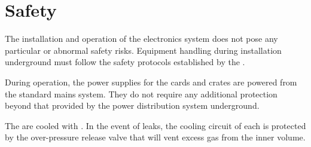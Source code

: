 \section{Safety}
\label{sec:dp-tpcelec-safety}
The installation and operation of the electronics system does not pose any particular or abnormal safety risks. %
Equipment handling during installation underground must %
follow the safety protocols established by the . 

During operation, the  power supplies for the  cards and  crates are powered from the standard mains system. They do not require any additional protection beyond that %
provided by the power distribution system underground. 

The  are cooled with . In the event of leaks, the cooling circuit of each  is protected by the over-pressure release valve that will vent excess gas from the inner volume.  
